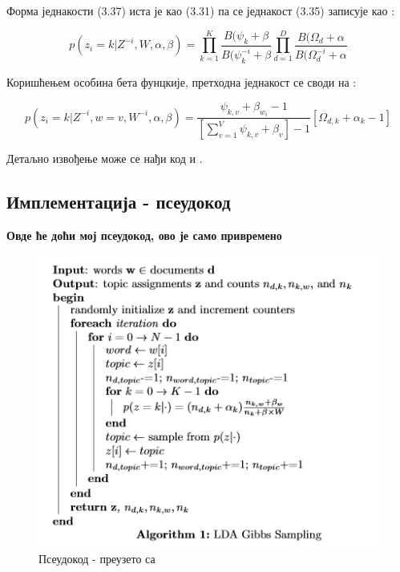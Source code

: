Форма једнакости (3.37) иста је као (3.31) па се једнакост (3.35) записује као :

\begin{equation}
p(z_i=k|Z^{-i},W,\alpha,\beta) = \prod_{k=1}^K\frac{B(\psi_k + \beta}{B(\psi_k^{-i}+\beta}\prod_{d=1}^D\frac{B(\Omega_d + \alpha}{B(\Omega_d^{-i} + \alpha}
\end{equation}

Коришћењем особина бета фунцкије, претходна једнакост се своди на :

\begin{equation}
p(z_i=k|Z^{-i},w=v,W^{-i},\alpha,\beta) = \frac{\psi_{k,v}+\beta_{w_i}-1}{\left[ \sum_{v=1}^V \psi_{k,v}+\beta_v \right] -1}\left[\Omega_{d,k}+\alpha_k-1 \right]
\end{equation}

Детаљно извођење може се нађи код \cite{verov9} и \cite{verov10}.

\subsection{Имплементација - псеудокод}
\textbf{Овде ће доћи мој псеудокод, ово је само привремено}
%
\begin{figure}[H]
  \includegraphics[scale=0.8]{./Slike/slika30.png} 
  \caption{Псеудокод - преузето са \cite{verov10} }\label{fig:slika27}
\end{figure}

